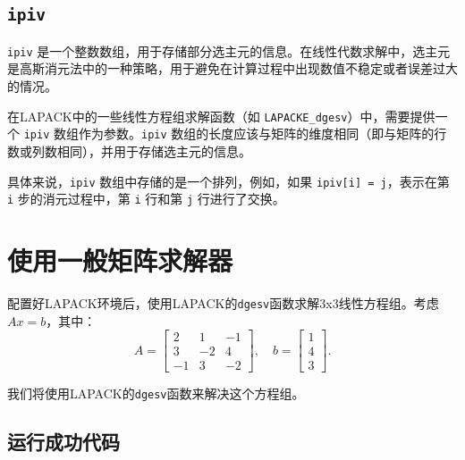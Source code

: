 \documentclass[a4paper,7pt,onecolumn,oneside]{article}
\begin{document}
\subsection{\texttt{ipiv}}
\label{sec:ipiv}
\texttt{ipiv} 是一个整数数组，用于存储部分选主元的信息。在线性代数求解中，选主元是高斯消元法中的一种策略，用于避免在计算过程中出现数值不稳定或者误差过大的情况。

在LAPACK中的一些线性方程组求解函数（如 \texttt{LAPACKE\_dgesv}）中，需要提供一个 \texttt{ipiv} 数组作为参数。\texttt{ipiv} 数组的长度应该与矩阵的维度相同（即与矩阵的行数或列数相同），并用于存储选主元的信息。

具体来说，\texttt{ipiv} 数组中存储的是一个排列，例如，如果 \texttt{ipiv[i] = j}，表示在第 \texttt{i} 步的消元过程中，第 \texttt{i} 行和第 \texttt{j} 行进行了交换。


\section{使用一般矩阵求解器}
配置好LAPACK环境后，使用LAPACK的\texttt{dgesv}函数求解3x3线性方程组。考虑 $Ax = b$，其中：
\[
  A =
  \begin{bmatrix}
    2 & 1 & -1 \\
    3 & -2 & 4 \\
    -1 & 3 & -2
  \end{bmatrix},
  \quad
  b =
  \begin{bmatrix}
    1 \\
    4 \\
    3
  \end{bmatrix}.
\]

我们将使用LAPACK的\texttt{dgesv}函数来解决这个方程组。

\subsection{运行成功代码}
\end{document}
